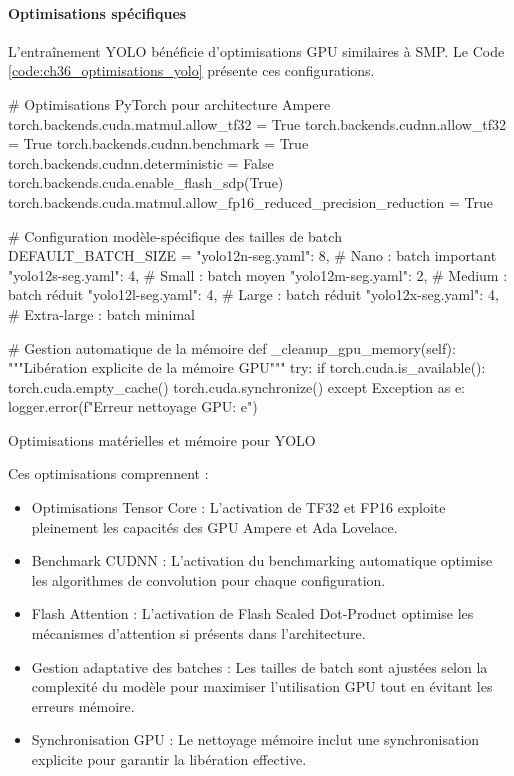 \paragraph{Optimisations spécifiques}
L'entraînement YOLO bénéficie d'optimisations GPU similaires à SMP. Le Code \ref{code:ch36_optimisations_yolo} présente ces configurations.

\begin{code}[H]
    \begin{pythoncode}
        # Optimisations PyTorch pour architecture Ampere
        torch.backends.cuda.matmul.allow_tf32 = True
        torch.backends.cudnn.allow_tf32 = True
        torch.backends.cudnn.benchmark = True
        torch.backends.cudnn.deterministic = False
        torch.backends.cuda.enable_flash_sdp(True)
        torch.backends.cuda.matmul.allow_fp16_reduced_precision_reduction = True
        
        # Configuration modèle-spécifique des tailles de batch
        DEFAULT_BATCH_SIZE = {
            "yolo12n-seg.yaml": 8,      # Nano : batch important
            "yolo12s-seg.yaml": 4,      # Small : batch moyen
            "yolo12m-seg.yaml": 2,      # Medium : batch réduit
            "yolo12l-seg.yaml": 4,      # Large : batch réduit
            "yolo12x-seg.yaml": 4,      # Extra-large : batch minimal
        }
        
        # Gestion automatique de la mémoire
        def _cleanup_gpu_memory(self):
            """Libération explicite de la mémoire GPU"""
            try:
                if torch.cuda.is_available():
                    torch.cuda.empty_cache()
                    torch.cuda.synchronize()
            except Exception as e:
                logger.error(f"Erreur nettoyage GPU: {e}")
    \end{pythoncode}
    \caption{Optimisations matérielles et mémoire pour YOLO}
    \label{code:ch36_optimisations_yolo}
\end{code}

Ces optimisations comprennent :
\begin{itemize}
    \item Optimisations Tensor Core : L'activation de TF32 et FP16 exploite pleinement les capacités des GPU Ampere et Ada Lovelace.
    \item Benchmark CUDNN : L'activation du benchmarking automatique optimise les algorithmes de convolution pour chaque configuration.
    \item Flash Attention : L'activation de Flash Scaled Dot-Product optimise les mécanismes d'attention si présents dans l'architecture.
    \item Gestion adaptative des batches : Les tailles de batch sont ajustées selon la complexité du modèle pour maximiser l'utilisation GPU tout en évitant les erreurs mémoire.
    \item Synchronisation GPU : Le nettoyage mémoire inclut une synchronisation explicite pour garantir la libération effective.
\end{itemize}

